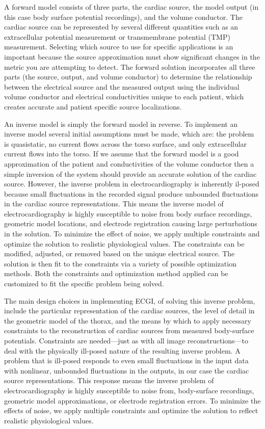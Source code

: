 A forward model consists of three parts, the cardiac source, the model
output (in this case body surface potential recordings), and the volume
conductor. The cardiac source can be represented by several different
quantities such as an extracellular potential measurement or transmembrane
potential (TMP) measurement. Selecting which source to use for specific
applications is an important because the source approximation must show
significant changes in the metric you are attempting to detect. The forward
solution incorporates all three parts (the source, output, and volume
conductor) to determine the relationship between the electrical source and
the measured output using the individual volume conductor and electrical
conductivities unique to each patient, which creates accurate and patient
specific source localizations.

An inverse model is simply the forward model in reverse. To implement an inverse model several initial
assumptions must be made, which are: the problem is quasistatic, no current
flows across the torso surface, and only extracellular current flows into
the torso. If we assume that
the forward model is a good approximation of the patient and conductivities
of the volume conductor then a simple inversion of the system should
provide an accurate solution of the cardiac source. However, the inverse
problem in electrocardiography is inherently il-posed because small
fluctuations in the recorded signal produce unbounded fluctuations in the
cardiac source representations. This means the inverse model of
electrocardiography is highly susceptible to noise from body surface
recordings, geometric model locations, and electrode registration causing
large perturbations in the solution. To minimize the effect of noise, we
apply multiple constraints and optimize the solution to realistic
physiological values. The constraints can be modified, adjusted, or
removed based on the unique electrical source. The solution is then fit to
the constraints via a variety of possible optimization methods. Both the
constraints and optimization method applied can be customized to fit the
specific problem being solved.


The main design choices in implementing ECGI, \ie{} of solving this inverse
problem, include the particular representation of the cardiac sources, the
level of detail in the geometric model of the thorax, and the means by
which to apply necessary constraints to the reconstruction of cardiac
sources from measured body-surface potentials.  Constraints are
needed---just as with all image reconstructions---to deal with the
physically ill-posed nature of the resulting inverse problem. A problem
that is ill-posed responds to even small fluctuations in the input data
with nonlinear, unbounded fluctuations in the outputs, in our case the
cardiac source representations. This response means the inverse problem of
electrocardiography is highly susceptible to noise from, \eg{} body-surface
recordings, geometric model approximations, or electrode registration
errors. To minimize the effects of noise, we apply multiple constraints and
optimize the solution to reflect realistic physiological values.

